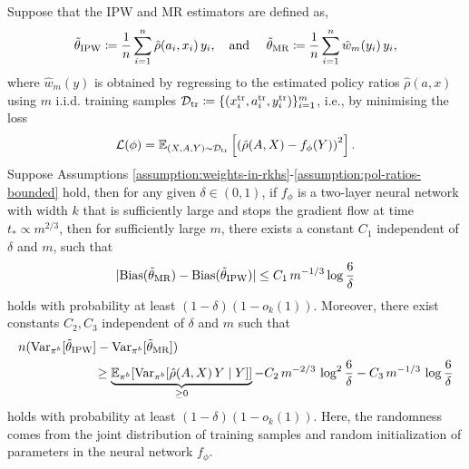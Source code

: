 \begin{theorem}\label{prop:bias-and-var-v3}
Suppose that the IPW and MR estimators are defined as,
\[
\tilde{\theta}_{\textup{IPW}} \coloneqq \frac{1}{n}\sum_{i=1}^n\hat{\rho}(a_i, x_i)\, y_i, \quad \text{and }\quad \tilde{\theta}_{\textup{MR}} \coloneqq \frac{1}{n}\sum_{i=1}^n\hat{w}_m(y_i)\, y_i,
\]
where $\hat{w}_m(y)$ is obtained by regressing to the estimated policy ratios $\hat{\rho}(a, x)$ using $m$ i.i.d. training samples $\mathcal{D}_{\textup{tr}} \coloneqq \{(x^{\textup{tr}}_i, a^{\textup{tr}}_i, y^{\textup{tr}}_i)\}_{i=1}^m$, i.e., by minimising the loss
\begin{align*}
    \mathcal{L}(\phi) = \mathbb{E}_{(X, A, Y)\sim \mathcal{D}_{\textup{tr}}} \left[\left(\hat{\rho}(A, X) - f_{\phi}(Y)\right)^2\right].
\end{align*}
Suppose Assumptions \ref{assumption:weights-in-rkhs}-\ref{assumption:pol-ratios-bounded} hold, then for any given $\delta \in (0, 1)$, if $f_\phi$ is a two-layer neural network with width $k$ that is sufficiently large and stops the gradient flow at time $t_* \propto m^{2/3}$, then for sufficiently large $m$, there exists a constant $C_1$ independent of $\delta$ and $m$, such that  
\[
|\textup{Bias}(\tilde{\theta}_{\textup{MR}}) - \textup{Bias}(\tilde{\theta}_{\textup{IPW}})| \leq C_1\, m^{-1/3} \log{\frac{6}{\delta}}
\]
holds with probability at least $(1-\delta)(1-o_{k}(1))$. Moreover, 
there exist constants $C_2, C_3$ independent of $\delta$ and $m$ such that 
\begin{align*}
    &n (\textup{Var}_{\pi^b}[\tilde{\theta}_{\textup{IPW}}] - \textup{Var}_{\pi^b}[\tilde{\theta}_{\textup{MR}}]) \\
    &\qquad \qquad \qquad \geq \underbrace{\mathbb{E}_{\pi^b}[\textup{Var}_{\pi^b}[\hat{\rho}(A, X)\,Y\mid Y]]}_{\geq 0} - C_2\,m^{-2/3}\,\log^2{\frac{6}{\delta}} - C_3\,m^{-1/3}\,\log{\frac{6}{\delta}}
\end{align*}
holds with probability at least $(1-\delta)(1-o_{k}(1))$. Here, the randomness comes from the joint distribution of training samples and random initialization of parameters in the neural network $f_{\phi}$. 
\end{theorem}

